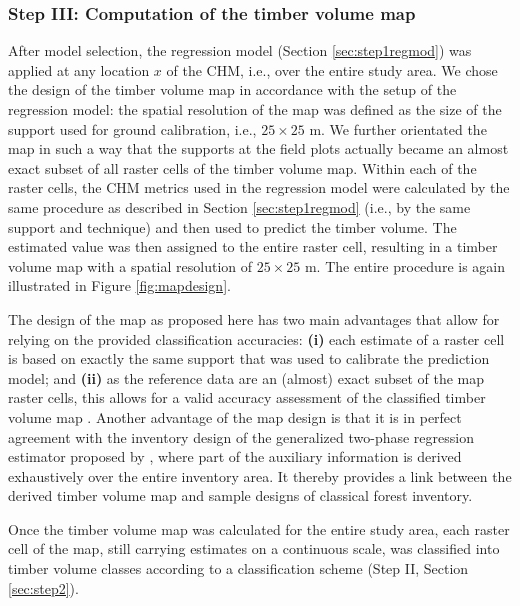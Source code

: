 \subsubsection{Step III: Computation of the timber volume map}
\label{sec:step3}

After model selection, the regression model (Section \ref{sec:step1regmod}) was applied at any location $x$ of the CHM, i.e., over the entire study area. We chose the design of the timber volume map in accordance with the setup of the regression model: the spatial resolution of the map was defined as the size of the support used for ground calibration, i.e., $25 \times 25$ m. We further orientated the map in such a way that the supports at the field plots actually became an almost exact subset of all raster cells of the timber volume map. Within each of the raster cells, the CHM metrics used in the regression model were calculated by the same procedure as described in Section \ref{sec:step1regmod} (i.e., by the same support and technique) and then used to predict the timber volume. The estimated value was then assigned to the entire raster cell, resulting in a timber volume map with a spatial resolution of $25 \times 25$ m. The entire procedure is again illustrated in Figure \ref{fig:mapdesign}.\par
The design of the map as proposed here has two main advantages that allow for relying on the provided classification accuracies: \textbf{(i)} each estimate of a raster cell is based on exactly the same support that was used to calibrate the prediction model; and \textbf{(ii)} as the reference data are an (almost) exact subset of the map raster cells, this allows for a valid accuracy assessment of the classified timber volume map \citep{congalton2008}. Another advantage of the map design is that it is in perfect agreement with the inventory design of the generalized two-phase regression estimator proposed by \citet{mandallaz2013b}, where part of the auxiliary information is derived exhaustively over the entire inventory area. It thereby provides a link between the derived timber volume map and sample designs of classical forest inventory.\par
Once the timber volume map was calculated for the entire study area, each raster cell of the map, still carrying estimates on a continuous scale, was classified into timber volume classes according to a classification scheme (Step II, Section \ref{sec:step2}).

